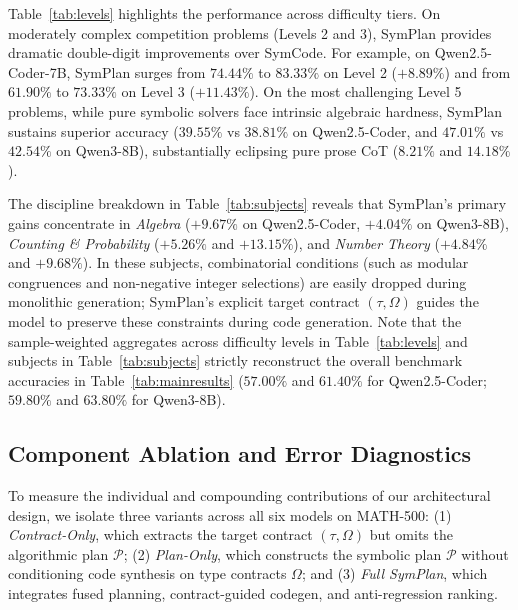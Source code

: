 \documentclass[runningheads]{llncs}
\begin{document}
Table~\ref{tab:levels} highlights the performance across difficulty tiers. On moderately complex competition problems (Levels 2 and 3), SymPlan provides dramatic double-digit improvements over SymCode. For example, on Qwen2.5-Coder-7B, SymPlan surges from $74.44\%$ to $83.33\%$ on Level 2 ($+8.89\%$) and from $61.90\%$ to $73.33\%$ on Level 3 ($+11.43\%$). On the most challenging Level 5 problems, while pure symbolic solvers face intrinsic algebraic hardness, SymPlan sustains superior accuracy ($39.55\%$ vs $38.81\%$ on Qwen2.5-Coder, and $47.01\%$ vs $42.54\%$ on Qwen3-8B), substantially eclipsing pure prose CoT ($8.21\%$ and $14.18\%$).

The discipline breakdown in Table~\ref{tab:subjects} reveals that SymPlan's primary gains concentrate in \textit{Algebra} ($+9.67\%$ on Qwen2.5-Coder, $+4.04\%$ on Qwen3-8B), \textit{Counting \& Probability} ($+5.26\%$ and $+13.15\%$), and \textit{Number Theory} ($+4.84\%$ and $+9.68\%$). In these subjects, combinatorial conditions (such as modular congruences and non-negative integer selections) are easily dropped during monolithic generation; SymPlan's explicit target contract $(\tau, \Omega)$ guides the model to preserve these constraints during code generation. Note that the sample-weighted aggregates across difficulty levels in Table~\ref{tab:levels} and subjects in Table~\ref{tab:subjects} strictly reconstruct the overall benchmark accuracies in Table~\ref{tab:mainresults} ($57.00\%$ and $61.40\%$ for Qwen2.5-Coder; $59.80\%$ and $63.80\%$ for Qwen3-8B).

\subsection{Component Ablation and Error Diagnostics}
\label{sec:ablation}

To measure the individual and compounding contributions of our architectural design, we isolate three variants across all six models on MATH-500: (1) \textit{Contract-Only}, which extracts the target contract $(\tau, \Omega)$ but omits the algorithmic plan $\mathcal{P}$; (2) \textit{Plan-Only}, which constructs the symbolic plan $\mathcal{P}$ without conditioning code synthesis on type contracts $\Omega$; and (3) \textit{Full SymPlan}, which integrates fused planning, contract-guided codegen, and anti-regression ranking.
\end{document}
